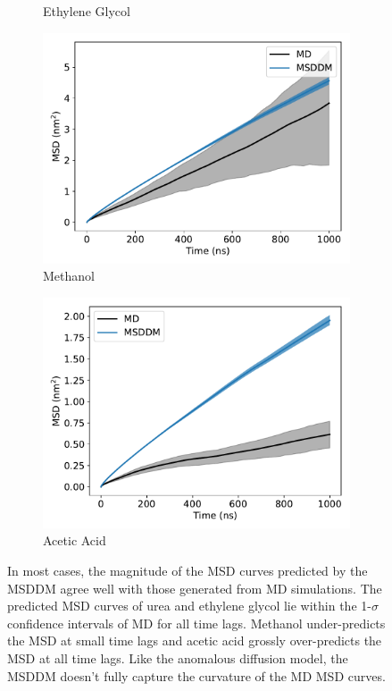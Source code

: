 \documentclass{article}
\begin{document}
\begin{figure}
\begin{subfigure}{0.45\textwidth}
  \caption{Ethylene Glycol}\label{fig:GCL_msddm}
  \end{subfigure}
  \begin{subfigure}{0.45\textwidth}
  \includegraphics[width=\textwidth]{MET_msddm.pdf}
  \caption{Methanol}\label{fig:MET_msddm}
  \end{subfigure}
  \begin{subfigure}{0.45\textwidth}
  \includegraphics[width=\textwidth]{ACH_msddm.pdf}
  \caption{Acetic Acid}\label{fig:ACH_msddm}
  \end{subfigure}
  \caption{In most cases, the magnitude of the MSD curves predicted by the 
  MSDDM agree well with those generated from MD simulations. The predicted MSD
  curves of urea and ethylene glycol lie within the 1-$\sigma$ confidence 
  intervals of MD for all time lags. Methanol under-predicts the MSD at small
  time lags and acetic acid grossly over-predicts the MSD at all time lags.
  Like the anomalous diffusion model, the MSDDM doesn't fully capture the 
  curvature of the MD MSD curves. }\label{fig:msddm_performance}
  \end{figure}
  
\end{document}

